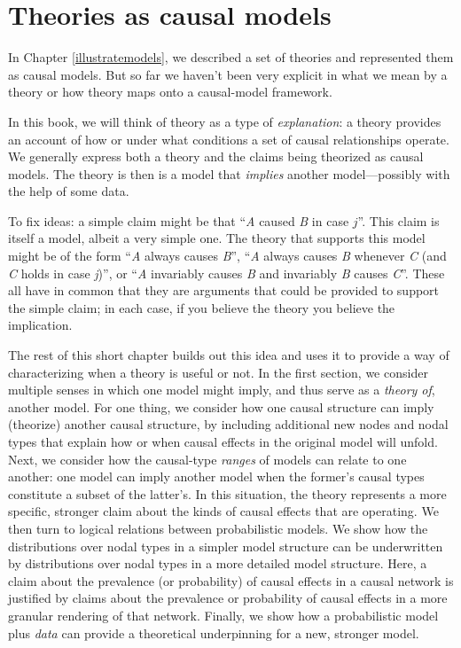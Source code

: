 \documentclass[
  12pt,
]{book}
\begin{document}
\hypertarget{theory}{%
\chapter{Theories as causal models}\label{theory}}

In Chapter \ref{illustratemodels}, we described a set of theories and represented them as causal models. But so far we haven't been very explicit in what we mean by a theory or how theory maps onto a causal-model framework.

In this book, we will think of theory as a type of \emph{explanation}: a theory provides an account of how or under what conditions a set of causal relationships operate. We generally express both a theory and the claims being theorized as causal models. The theory is then is a model that \emph{implies} another model---possibly with the help of some data.

To fix ideas: a simple claim might be that ``\emph{A} caused \emph{B} in case \(j\)''. This claim is itself a model, albeit a very simple one. The theory that supports this model might be of the form ``\emph{A} always causes \emph{B}'', ``\emph{A} always causes \emph{B} whenever \emph{C} (and \emph{C} holds in case \emph{j})'', or ``\emph{A} invariably causes \emph{B} and invariably \emph{B} causes \emph{C}''. These all have in common that they are arguments that could be provided to support the simple claim; in each case, if you believe the theory you believe the implication.

The rest of this short chapter builds out this idea and uses it to provide a way of characterizing when a theory is useful or not.
In the first section, we consider multiple senses in which one model might imply, and thus serve as a \emph{theory of}, another model. For one thing, we consider how one causal structure can imply (theorize) another causal structure, by including additional new nodes and nodal types that explain how or when causal effects in the original model will unfold. Next, we consider how the causal-type \emph{ranges} of models can relate to one another: one model can imply another model when the former's causal types constitute a subset of the latter's. In this situation, the theory represents a more specific, stronger claim about the kinds of causal effects that are operating. We then turn to logical relations between probabilistic models. We show how the distributions over nodal types in a simpler model structure can be underwritten by distributions over nodal types in a more detailed model structure. Here, a claim about the prevalence (or probability) of causal effects in a causal network is justified by claims about the prevalence or probability of causal effects in a more granular rendering of that network. Finally, we show how a probabilistic model plus \emph{data} can provide a theoretical underpinning for a new, stronger model.
\end{document}
